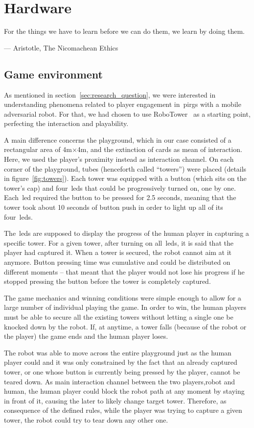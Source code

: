 \chapter{Hardware}\label{ch:foundation}
\epigraph{For the things we have to learn before we can do them, we learn by doing them.}{--- Aristotle, The Nicomachean Ethics}
\section{Game environment}\label{sec:game_environment}
As mentioned in section~\ref{sec:research_question}, we were interested in understanding phenomena related to player engagement in~\gls{pirg}s with a mobile adversarial robot. For that, we had chosen to use RoboTower~\citep{bonarini_timing_2014} as a starting point, perfecting the interaction and playability.

A main difference concerns the playground, which in our case consisted of a rectangular area of 4m$\times$4m, and the extinction of cards as mean of interaction. Here, we used the player's proximity instead as interaction channel. On each corner of the playground, tubes (henceforth called ``towers'') were placed (details in figure~\ref{fig:towers}). Each tower was equipped with a button (which sits on the tower's cap) and four~\gls{led}s that could be progressively turned on, one by one.  Each~\gls{led} required the button to be pressed for 2.5 seconds, meaning that the tower took about 10 seconds of button push in order to light up all of its four~\gls{led}s.

The~\gls{led}s are supposed to display the progress of the human player in capturing a specific tower. For a given tower, after turning on all~\gls{led}s, it is said that the player had captured it. When a tower is secured, the robot cannot aim at it anymore.
Button pressing time was cumulative and could be distributed on different moments -- that meant that the player would not lose his progress if he stopped pressing the button before the tower is completely captured. 

The game mechanics and winning conditions were simple enough to allow for a large number of individual playing the game. In order to win, the human players must be able to secure all the existing towers without letting a single one be knocked down by the robot. If, at anytime, a tower falls (because of the robot or the player) the game ends and the human player loses. 

The robot was able to move across the entire playground just as the human player could and it was only constrained by the fact that an already captured tower, or one whose button is currently being pressed by the player, cannot be teared down. As main interaction channel between the two players,\ie robot and human, the human player could block the robot path at any moment by staying in front of it, causing the later to likely change target tower. Therefore, as consequence of the defined rules, while the player was trying to capture a given tower, the robot could try to tear down any other one.

